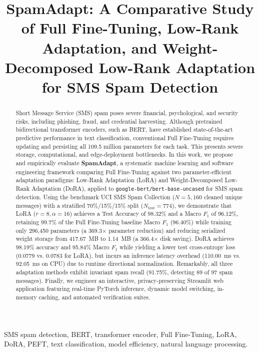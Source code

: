 \documentclass[conference]{IEEEtran}
\title{SpamAdapt: A Comparative Study of Full Fine-Tuning, Low-Rank Adaptation, and Weight-Decomposed Low-Rank Adaptation for SMS Spam Detection}
\author{
    \IEEEauthorblockN{Akash\IEEEauthorrefmark{1}}
    \IEEEauthorblockA{\IEEEauthorrefmark{1}Department of Computer Science and Engineering\\
    [Institution / University Name Placeholder], [City, Country Placeholder]\\
    Email: [author.email@institution.edu Placeholder]}
}
\begin{document}
\maketitle

\begin{abstract}
Short Message Service (SMS) spam poses severe financial, psychological, and security risks, including phishing, fraud, and credential harvesting. Although pretrained bidirectional transformer encoders, such as BERT, have established state-of-the-art predictive performance in text classification, conventional Full Fine-Tuning requires updating and persisting all 109.5 million parameters for each task. This presents severe storage, computational, and edge-deployment bottlenecks. In this work, we propose and empirically evaluate \textbf{SpamAdapt}, a systematic machine learning and software engineering framework comparing Full Fine-Tuning against two parameter-efficient adaptation paradigms: Low-Rank Adaptation (LoRA) and Weight-Decomposed Low-Rank Adaptation (DoRA), applied to \texttt{google-bert/bert-base-uncased} for SMS spam detection. Using the benchmark UCI SMS Spam Collection ($N=5,160$ cleaned unique messages) with a stratified 70\%/15\%/15\% split ($N_{\text{test}}=774$), we demonstrate that LoRA ($r=8, \alpha=16$) achieves a Test Accuracy of 98.32\% and a Macro $F_1$ of 96.12\%, retaining 99.7\% of the Full Fine-Tuning baseline Macro $F_1$ (96.40\%) while training only 296,450 parameters (a 369.3$\times$ parameter reduction) and reducing serialized weight storage from 417.67~MB to 1.14~MB (a 366.4$\times$ disk saving). DoRA achieves 98.19\% accuracy and 95.84\% Macro $F_1$ while yielding a lower test cross-entropy loss (0.0779 vs. 0.0783 for LoRA), but incurs an inference latency overhead (110.00~ms vs. 92.05~ms on CPU) due to runtime directional normalization. Remarkably, all three adaptation methods exhibit invariant spam recall (91.75\%, detecting 89 of 97 spam messages). Finally, we engineer an interactive, privacy-preserving Streamlit web application featuring real-time PyTorch inference, dynamic model switching, in-memory caching, and automated verification suites.
\end{abstract}

\begin{IEEEkeywords}
SMS spam detection, BERT, transformer encoder, Full Fine-Tuning, LoRA, DoRA, PEFT, text classification, model efficiency, natural language processing.
\end{IEEEkeywords}
\end{document}

